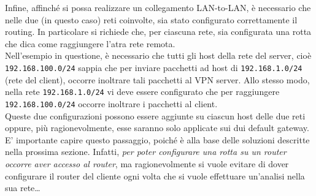Infine, affinché si possa realizzare un collegamento LAN-to-LAN, è necessario che
nelle due (in questo caso) reti coinvolte, sia stato configurato correttamente
il routing. In particolare si richiede che, per ciascuna rete, sia configurata una rotta
che dica come raggiungere l'atra rete remota.\\
Nell'esempio in questione, è necessario che tutti gli host della rete del server, cioè
\texttt{192.168.100.0/24} sappia che per inviare pacchetti ad host di \texttt{192.168.1.0/24}
(rete del client), occorre inoltrare tali pacchetti al VPN server. Allo stesso modo,
nella rete \texttt{192.168.1.0/24} vi deve essere configurato che per raggiungere
\texttt{192.168.100.0/24} occorre inoltrare i pacchetti al client.\\
Queste due configurazioni possono essere aggiunte su ciascun host delle due reti oppure,
più ragionevolmente, esse saranno solo applicate sui dui default gateway. E' importante
capire questo passaggio, poiché è alla base delle soluzioni descritte nella prossima
sezione. Infatti, \textit{per poter configurare una rotta su un router occorre aver
accesso al router}, ma ragionevolmente si vuole evitare di dover configurare
il router del cliente ogni volta che si vuole effettuare un'analisi nella sua rete\ldots




